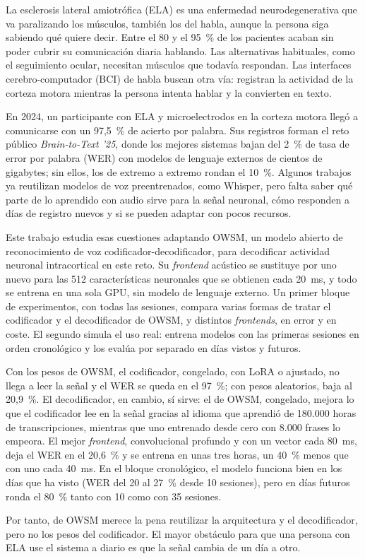 
La esclerosis lateral amiotrófica (ELA) es una enfermedad neurodegenerativa que va paralizando
los músculos, también los del habla, aunque la persona siga sabiendo qué quiere decir. Entre el
80 y el 95~\% de los pacientes acaban sin poder cubrir su comunicación diaria hablando. Las
alternativas habituales, como el seguimiento ocular, necesitan músculos que todavía respondan.
Las interfaces cerebro-computador (BCI) de habla buscan otra vía: registran la actividad de la
corteza motora mientras la persona intenta hablar y la convierten en texto.

En 2024, un participante con ELA y microelectrodos en la corteza motora llegó a comunicarse con
un 97,5~\% de acierto por palabra. Sus registros forman el reto público
\textit{Brain-to-Text '25}, donde los mejores sistemas bajan del 2~\% de tasa de error por
palabra (WER) con modelos de lenguaje externos de cientos de gigabytes; sin ellos, los de
extremo a extremo rondan el 10~\%. Algunos trabajos ya reutilizan modelos de voz
preentrenados, como Whisper, pero falta saber qué parte de lo aprendido con audio sirve para la
señal neuronal, cómo responden a días de registro nuevos y si se pueden adaptar con pocos
recursos.

Este trabajo estudia esas cuestiones adaptando OWSM, un modelo abierto de reconocimiento de voz
codificador-decodificador, para decodificar actividad neuronal intracortical en este reto. Su
\textit{frontend} acústico se sustituye por uno nuevo para las 512 características neuronales
que se obtienen cada 20~ms, y todo se entrena en una sola GPU, sin modelo de lenguaje externo.
Un primer bloque de experimentos, con todas las sesiones, compara varias formas de tratar el
codificador y el decodificador de OWSM, y distintos \textit{frontends}, en error y en coste. El
segundo simula el uso real: entrena modelos con las primeras sesiones en orden cronológico y los
evalúa por separado en días vistos y futuros.

Con los pesos de OWSM, el codificador, congelado, con LoRA o ajustado, no llega a leer la señal
y el WER se queda en el 97~\%; con pesos aleatorios, baja al 20,9~\%. El decodificador, en
cambio, sí sirve: el de OWSM, congelado, mejora lo que el codificador lee en la señal gracias al
idioma que aprendió de 180.000 horas de transcripciones, mientras que uno entrenado desde cero
con 8.000 frases lo empeora. El mejor \textit{frontend}, convolucional
profundo y con un vector cada 80~ms, deja el WER en el 20,6~\% y se entrena en unas tres horas,
un 40~\% menos que con uno cada 40~ms. En el bloque cronológico, el modelo funciona bien en los
días que ha visto (WER del 20 al 27~\% desde 10 sesiones), pero en días futuros ronda el 80~\%
tanto con 10 como con 35 sesiones.

Por tanto, de OWSM merece la pena reutilizar la arquitectura y el decodificador, pero no los
pesos del codificador. El mayor obstáculo para que una persona con ELA use el sistema a diario
es que la señal cambia de un día a otro.
